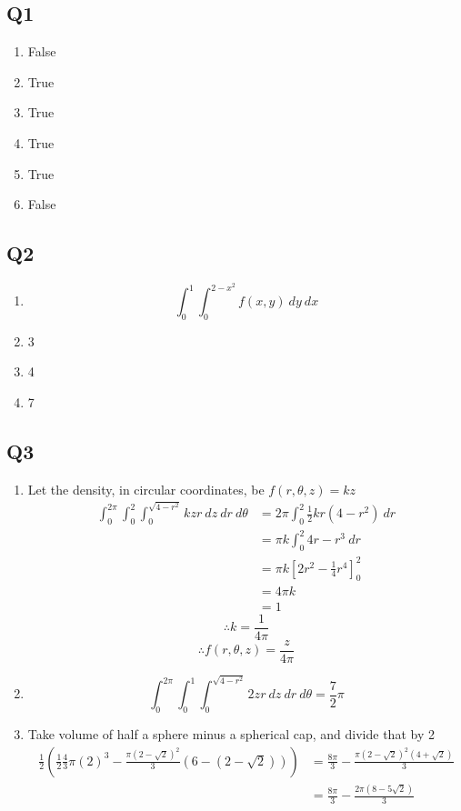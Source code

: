 \documentclass{article}
\newcommand{\paren}[1]{\left(#1\right)}
\newcommand{\brac}[1]{\left[#1\right]}
\begin{document}
\subsection*{Q1}

\begin{enumerate}[label=\alph*.]
\item False
\item True
\item True
\item True
\item True
\item False
\end{enumerate}

\subsection*{Q2}

\begin{enumerate}[label=\alph*.]
\item
\[\int_0^1 \int_0^{2-x^2} f(x,y)\ dy\ dx\]
\item 3
\item 4
\item 7
\end{enumerate}

\subsection*{Q3}

\begin{enumerate}[label=\alph*.]
\item
Let the density, in circular coordinates, be $f(r,\theta,z) = kz$
\begin{align*}
\int_0^{2\pi} \int_0^2 \int_0^{\sqrt{4-r^2}} kzr\ dz\ dr\ d\theta
&= 2\pi \int_0^2 \frac{1}{2} kr(4-r^2)\ dr \\
&= \pi k \int_0^2 4r-r^3\ dr \\
&= \pi k \brac{2r^2-\frac{1}{4}r^4}_0^2 \\
&= 4\pi k \\
&= 1
\end{align*}
\[\therefore k=\frac{1}{4\pi}\]
\[\therefore f(r,\theta,z) = \frac{z}{4\pi}\]

\item
\[\int_0^{2\pi} \int_0^1 \int_0^{\sqrt{4-r^2}} 2zr\ dz\ dr\ d\theta = \frac{7}{2}\pi\]
\item
Take volume of half a sphere minus a spherical cap, and divide that by 2
\begin{align*}
\frac{1}{2}\paren{\frac{1}{2}\frac{4}{3}\pi(2)^3 - \frac{\pi(2-\sqrt{2})^2}{3}(6-(2-\sqrt{2}))}
&= \frac{8\pi}{3} - \frac{\pi(2-\sqrt{2})^2(4+\sqrt{2})}{3} \\
&= \frac{8\pi}{3} - \frac{2\pi(8-5\sqrt{2})}{3}
\end{align*}
\end{enumerate}
\end{document}
